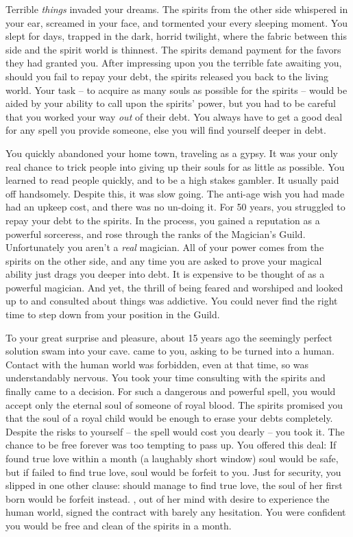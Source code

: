 \documentclass[char]{NeptuneBall}
\begin{document}
Terrible \emph{things} invaded your dreams. The spirits from the other side whispered in your ear, screamed in your face, and tormented your every sleeping moment. You slept for days, trapped in the dark, horrid twilight, where the fabric between this side and the spirit world is thinnest. The spirits demand payment for the favors they had granted you. After impressing upon you the terrible fate awaiting you, should you fail to repay your debt, the spirits released you back to the living world. Your task -- to acquire as many souls as possible for the spirits -- would be aided by your ability to call upon the spirits' power, but you had to be careful that you worked your way \emph{out} of their debt. You always have to get a good deal for any spell you provide someone, else you will find yourself deeper in debt.

You quickly abandoned your home town, traveling \pAtlantis{} as a gypsy. It was your only real chance to trick people into giving up their souls for as little as possible. You learned to read people quickly, and to be a high stakes gambler. It usually paid off handsomely. Despite this, it was slow going. The anti-age wish you had made had an upkeep cost, and there was no un-doing it. For 50 years, you struggled to repay your debt to the spirits. In the process, you gained a reputation as a powerful sorceress, and rose through the ranks of the Magician's Guild. Unfortunately you aren't a \emph{real} magician. All of your power comes from the spirits on the other side, and any time you are asked to prove your magical ability just drags you deeper into debt. It is expensive to be thought of as a powerful magician. And yet, the thrill of being feared and worshiped and looked up to and consulted about things was addictive. You could never find the right time to step down from your position in the Guild.

To your great surprise and pleasure, about 15 years ago the seemingly perfect solution swam into your cave. \cAriel{\Prince} \cAriel{} came to you, asking to be turned into a human. Contact with the human world was forbidden, even at that time, so \cAriel{} was understandably nervous. You took your time consulting with the spirits and finally came to a decision. For such a dangerous and powerful spell, you would accept only the eternal soul of someone of royal blood. The spirits promised you that the soul of a royal child would be enough to erase your debts completely. Despite the risks to yourself -- the spell would cost you dearly -- you took it. The chance to be free forever was too tempting to pass up. You offered \cAriel{} this deal: If \cAriel{\they} found true love within a month (a laughably short window) \cAriel{\them} soul would be safe, but if \cAriel{} failed to find true love, \cAriel{\them} soul would be forfeit to you. Just for security, you slipped in one other clause: should \cAriel{} manage to find true love, the soul of her first born \cArielsSon{\offspring} would be forfeit instead. \cAriel{}, out of her mind with desire to experience the human world, signed the contract with barely any hesitation. You were confident you would be free and clean of the spirits in a month.
\end{document}
